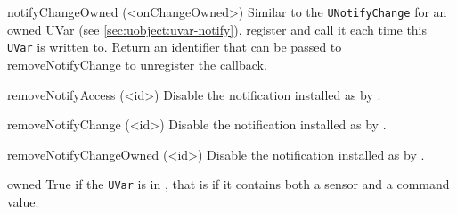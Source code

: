 \begin{urbiscriptapi}
\item[notifyChangeOwned](<onChangeOwned>)%
  Similar to the \Cxx \lstinline|UNotifyChange| for an owned UVar (see
  \autoref{sec:uobject:uvar-notify}), register  and call it
  each time this \lstinline|UVar| is written to.  Return an identifier that
  can be passed to removeNotifyChange to unregister the callback.

\item[removeNotifyAccess](<id>)%
  Disable the notification installed as  by .

\item[removeNotifyChange](<id>)%
  Disable the notification installed as  by .

\item[removeNotifyChangeOwned](<id>)%
  Disable the notification installed as  by
  .

\item[owned]%
  True if the \lstinline|UVar| is in , that is if it
  contains both a sensor and a command value.

\end{urbiscriptapi}

